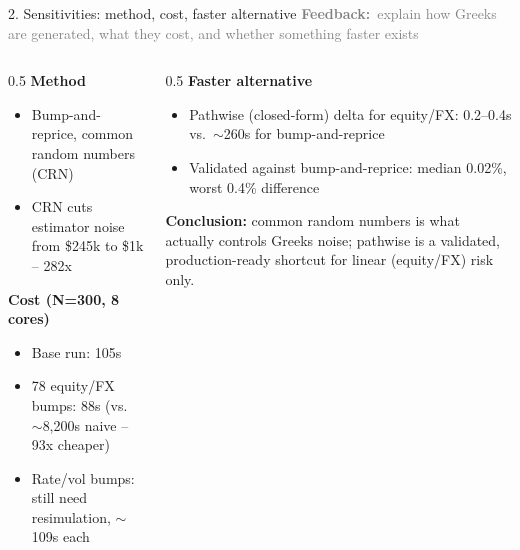 \documentclass[9pt,aspectratio=169]{beamer}
\newcommand{\feedbacktag}[1]{{\small\textcolor{grey}{\textbf{Feedback:}~#1}}}
\begin{document}
\begin{frame}{2. Sensitivities: method, cost, faster alternative}
  \feedbacktag{explain how Greeks are generated, what they cost, and whether something faster exists}
  \begin{columns}[T]
    \begin{column}{0.5\textwidth}
      \textbf{Method}
      \begin{itemize}
        \item Bump-and-reprice, common random numbers (CRN)
        \item CRN cuts estimator noise from \$245k to \$1k -- 282x
      \end{itemize}
      \textbf{Cost (N=300, 8 cores)}
      \begin{itemize}
        \item Base run: 105s
        \item 78 equity/FX bumps: 88s (vs.\ $\sim$8,200s naive -- 93x cheaper)
        \item Rate/vol bumps: still need resimulation, $\sim$109s each
      \end{itemize}
    \end{column}
    \begin{column}{0.5\textwidth}
      \textbf{Faster alternative}
      \begin{itemize}
        \item Pathwise (closed-form) delta for equity/FX: 0.2--0.4s vs.\ $\sim$260s for bump-and-reprice
        \item Validated against bump-and-reprice: median 0.02\%, worst 0.4\% difference
      \end{itemize}
      \vspace{6pt}
      \textbf{Conclusion:} common random numbers is what actually controls Greeks noise; pathwise is a validated, production-ready shortcut for linear (equity/FX) risk only.
    \end{column}
  \end{columns}
\end{frame}
\end{document}
